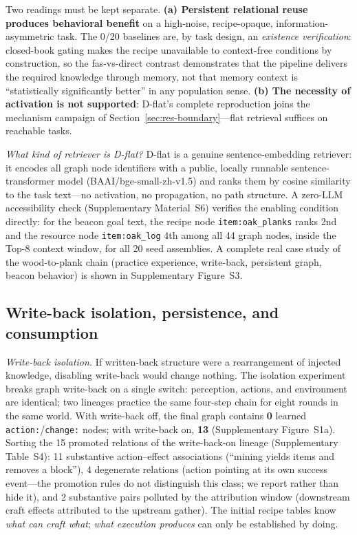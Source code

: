 \documentclass[10pt,a4paper]{article}
\begin{document}
Two readings must be kept separate. \textbf{(a) Persistent relational reuse produces behavioral benefit} on a high-noise, recipe-opaque, information-asymmetric task. The 0/20 baselines are, by task design, an \emph{existence verification}: closed-book gating makes the recipe unavailable to context-free conditions by construction, so the fas-vs-direct contrast demonstrates that the pipeline delivers the required knowledge through memory, not that memory context is ``statistically significantly better'' in any population sense. \textbf{(b) The necessity of activation is not supported}: D-flat's complete reproduction joins the mechanism campaign of Section~\ref{sec:res-boundary}---flat retrieval suffices on reachable tasks.

\emph{What kind of retriever is D-flat?} D-flat is a genuine sentence-embedding retriever: it encodes all graph node identifiers with a public, locally runnable sentence-transformer model (BAAI/bge-small-zh-v1.5) and ranks them by cosine similarity to the task text---no activation, no propagation, no path structure. A zero-LLM accessibility check (Supplementary Material~S6) verifies the enabling condition directly: for the beacon goal text, the recipe node \texttt{item:oak\_planks} ranks 2nd and the resource node \texttt{item:oak\_log} 4th among all 44 graph nodes, inside the Top-8 context window, for all 20 seed assemblies. A complete real case study of the wood-to-plank chain (practice experience, write-back, persistent graph, beacon behavior) is shown in Supplementary Figure~S3.

\subsection{Write-back isolation, persistence, and consumption}
\label{sec:res-persist}

\emph{Write-back isolation.} If written-back structure were a rearrangement of injected knowledge, disabling write-back would change nothing. The isolation experiment breaks graph write-back on a single switch: perception, actions, and environment are identical; two lineages practice the same four-step chain for eight rounds in the same world. With write-back off, the final graph contains \textbf{0} learned \texttt{action:}/\texttt{change:} nodes; with write-back on, \textbf{13} (Supplementary Figure~S1a). Sorting the 15 promoted relations of the write-back-on lineage (Supplementary Table~S4): 11 substantive action--effect associations (``mining yields items and removes a block''), 4 degenerate relations (action pointing at its own success event---the promotion rules do not distinguish this class; we report rather than hide it), and 2 substantive pairs polluted by the attribution window (downstream craft effects attributed to the upstream gather). The initial recipe tables know \emph{what can craft what}; \emph{what execution produces} can only be established by doing.
\end{document}
